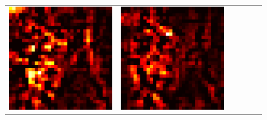 \documentclass[preprint,12pt]{elsarticle}
\begin{document}
\begin{figure}[p]
\begin{tabular}{cccccc}
  \includegraphics[scale=\scale]{../visualizations/examples/cifar10/cnn/positive_saliency_map/2.png} & 
  \includegraphics[scale=\scale]{../visualizations/examples/cifar10/cnn/negative_saliency_map/2.png} & 

\end{tabular}
\end{figure}
\end{document}
